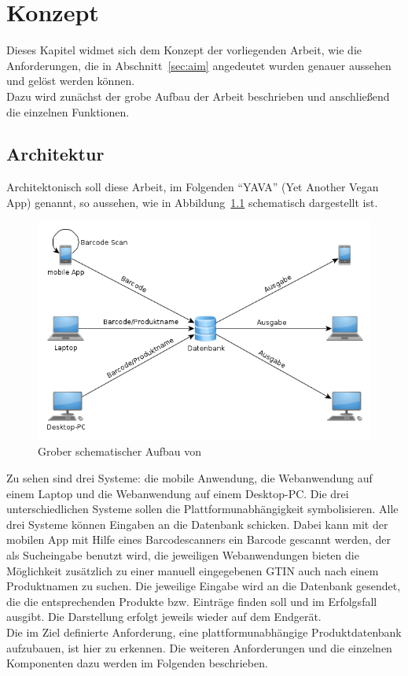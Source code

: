 \chapter{Konzept}
\label{chap:concept}

Dieses Kapitel widmet sich dem Konzept der vorliegenden Arbeit, wie
die Anforderungen, die in Abschnitt~\ref{sec:aim}
angedeutet wurden genauer aussehen und gelöst werden können.\\
Dazu wird zunächst der grobe Aufbau der Arbeit beschrieben und
anschließend die einzelnen Funktionen.

\section{Architektur}

Architektonisch soll diese Arbeit, im Folgenden "`YAVA"' (Yet Another Vegan App)
genannt, so aussehen, wie in Abbildung~\ref{img:concept} schematisch dargestellt ist.

\begin{figure}[ht]
	\centering
	\includegraphics[scale=0.7]{misc/concept.png}
	\caption{Grober schematischer Aufbau von \name}
	\label{img:concept}
\end{figure}

Zu sehen sind drei Systeme: die mobile Anwendung, die Webanwendung
auf einem Laptop und die Webanwendung auf einem Desktop-PC.
Die drei unterschiedlichen Systeme sollen die Plattformunabhängigkeit symbolisieren.
Alle drei Systeme können Eingaben an die Datenbank schicken.
Dabei kann mit der mobilen App mit
Hilfe eines Barcodescanners ein Barcode gescannt werden, der als
Sucheingabe benutzt wird, die jeweiligen Webanwendungen bieten die Möglichkeit
zusätzlich zu einer manuell eingegebenen
GTIN auch nach einem Produktnamen zu suchen.
Die jeweilige Eingabe wird an die Datenbank gesendet, die die
entsprechenden Produkte bzw. Einträge finden soll und im Erfolgsfall ausgibt.
Die Darstellung erfolgt jeweils wieder auf dem Endgerät.\\
Die im Ziel definierte Anforderung, eine plattformunabhängige Produktdatenbank
aufzubauen, ist hier zu erkennen. Die weiteren Anforderungen und die einzelnen Komponenten dazu
werden im Folgenden beschrieben.

